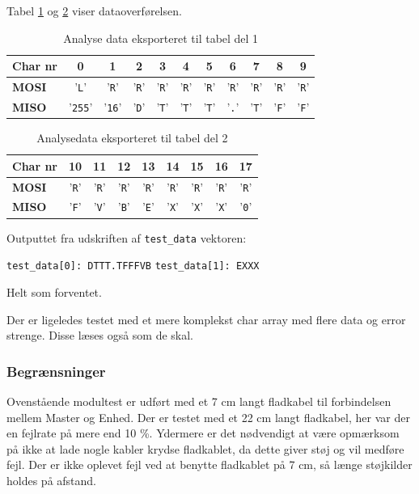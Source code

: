 Tabel \ref{table:scop_getlog1} og \ref{table:scop_getlog2} viser dataoverførelsen. 

\begin{table}[H]
	\caption{Analyse data eksporteret til tabel del 1}
	\centering
	\begin{tabular}{|l|c|c|c|c|c|c|c|c|c|c|}
		\hline 
		\textbf{Char nr} & \textbf{0} & \textbf{1} & \textbf{2} & \textbf{3} & \textbf{4} & \textbf{5} 
						 & \textbf{6} & \textbf{7} & \textbf{8} & \textbf{9}\\ 		
		\hline 
		\textbf{MOSI} & '\verb+L+' & '\verb+R+' & '\verb+R+' & '\verb+R+' & '\verb+R+' & '\verb+R+' 
						& '\verb+R+' & '\verb+R+' & '\verb+R+' & '\verb+R+'\\ 
		\hline 
		\textbf{MISO} & '\verb+255+' & '\verb+16+' & '\verb+D+' & '\verb+T+' & '\verb+T+' & '\verb+T+' 
						& '\verb+.+' & '\verb+T+' & '\verb+F+' & '\verb+F+'\\
						 
		\hline 
	\end{tabular} 
	\label{table:scop_getlog1}
\end{table}


\begin{table}[H]
	\caption{Analysedata eksporteret til tabel del 2}
	\centering
	\begin{tabular}{|l|c|c|c|c|c|c|c|c|}
		\hline 
		\textbf{Char nr} & \textbf{10} & \textbf{11} & \textbf{12} & \textbf{13}
						& \textbf{14} & \textbf{15} & \textbf{16} & \textbf{17}\\ 		
		\hline 
		\textbf{MOSI} 	& '\verb+R+' & '\verb+R+' & '\verb+R+' & '\verb+R+'
						& '\verb+R+' & '\verb+R+' & '\verb+R+' & '\verb+R+' \\ 
		\hline 
		\textbf{MISO}	& '\verb+F+' & '\verb+V+' & '\verb+B+' & '\verb+E+'
						& '\verb+X+' & '\verb+X+' & '\verb+X+' & '\verb+0+'\\
						 
		\hline 
	\end{tabular} 
	\label{table:scop_getlog2}
\end{table}

Outputtet fra udskriften af \verb+test_data+ vektoren:

\verb+test_data[0]: DTTT.TFFFVB+ \newline
\verb+test_data[1]: EXXX+

Helt som forventet.

Der er ligeledes testet med et mere komplekst char array med flere data og error strenge. Disse læses også som de skal. 

\subsubsection*{Begrænsninger}

Ovenstående modultest er udført med et 7 cm langt fladkabel til forbindelsen mellem Master og Enhed. Der er testet med et 22 cm langt fladkabel, her var der en fejlrate på mere end 10 \%. Ydermere er det nødvendigt at være opmærksom på ikke at lade nogle kabler krydse fladkablet, da dette giver støj og vil medføre fejl. Der er ikke oplevet fejl ved at benytte fladkablet på 7 cm, så længe støjkilder holdes på afstand.   